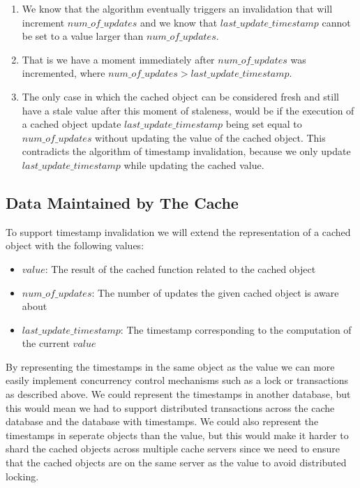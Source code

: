 \begin{enumerate}
  \item We know that the algorithm eventually triggers an invalidation that will increment $num\_of\_updates$ and we know that $last\_update\_timestamp$ cannot be set to a value larger than $num\_of\_updates$.
  \item That is we have a moment immediately after $num\_of\_updates$ was incremented, where $num\_of\_updates > last\_update\_timestamp$.
  \item The only case in which the cached object can be considered fresh and still have a stale value after this moment of staleness, would be if the execution of a cached object update $last\_update\_timestamp$ being set equal to $num\_of\_updates$ without updating the value of the cached object. This contradicts the algorithm of timestamp invalidation, because we only update $last\_update\_timestamp$ while updating the cached value.
\end{enumerate}



\subsection{Data Maintained by The Cache}
\label{subsec:data-maintained-by-the-cache}

To support timestamp invalidation we will extend the representation of a cached object with the following values:

\begin{itemize}
  \item $value$: The result of the cached function related to the cached object
  \item $num\_of\_updates$: The number of updates the given cached object is aware about
  \item $last\_update\_timestamp$: The timestamp corresponding to the computation of the current $value$
\end{itemize}

By representing the timestamps in the same object as the value we can more easily implement concurrency control mechanisms such as a lock or transactions as described above. We could represent the timestamps in another database, but this would mean we had to support distributed transactions across the cache database and the database with timestamps. We could also represent the timestamps in seperate objects than the value, but this would make it harder to shard the cached objects across multiple cache servers since we need to ensure that the cached objects are on the same server as the value to avoid distributed locking.


